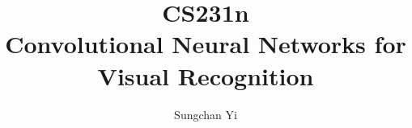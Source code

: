 \documentclass[12pt]{article}
\title{\textbf{CS231n}\\\large Convolutional Neural Networks for Visual Recognition}
\author{Sungchan Yi}
\begin{document}
\maketitle

\tableofcontents
\pagebreak



% 
% 
% 
\end{document}
